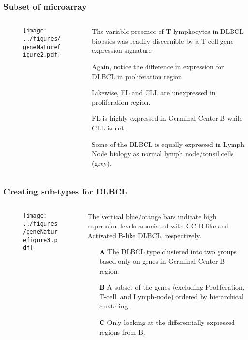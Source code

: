 \documentclass{beamer}
\begin{document}
\begin{frame}[fragile]
\frametitle{Subset of microarray}
\begin{columns}[T]
\begin{column}{.6\textwidth}
\begin{figure}
\centering
  \texttt{[image: ../figures/geneNaturefigure2.pdf]} 
\end{figure}
\end{column}
\begin{column}{.4\textwidth} 
\scriptsize
\vsp
\vsp

\vsp
The variable presence of T lymphocytes in DLBCL biopsies was
readily discernible by a T-cell gene expression signature

\vsp
Again, notice the difference in expression for DLBCL in proliferation region

\vsp
Likewise, FL and CLL are unexpressed in proliferation region.

\vsp
FL is highly expressed in Germinal Center B while  CLL is not.

\vsp
Some of the DLBCL is equally expressed in Lymph Node biology as
normal lymph node/tonsil cells (grey). 

\end{column}
\end{columns}
\end{frame}


\begin{frame}[fragile]
\frametitle{Creating sub-types for DLBCL}
\begin{columns}[T]
\begin{column}{.6\textwidth}
\begin{figure}
\centering
  \texttt{[image: ../figures/geneNaturefigure3.pdf]} 
\end{figure}
\end{column}
\begin{column}{.4\textwidth} 
\scriptsize
\vsp
\vsp

The vertical blue/orange bars indicate high expression levels associated with GC B-like
and Activated B-like DLBCL, respectively.

\begin{itemize}
\item[\textbf{\textcolor{black}{A}}] The DLBCL type clustered into two groups
based only on genes in Germinal Center B region.
\item[\textbf{\textcolor{black}{B}}] A subset of the genes (excluding Proliferation,
T-cell, and Lymph-node) ordered by hierarchical clustering.
\item[\textbf{\textcolor{black}{C}}] Only looking at the differentially expressed regions from B.
\end{itemize}
\end{column}
\end{columns}
\end{frame}
\end{document}
